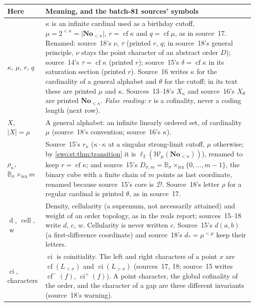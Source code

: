 \documentclass[11pt]{article}
\theoremstyle{definition}
\theoremstyle{remark}
\newcommand{\No}{\mathbf{No}}
\newcommand{\WO}{\mathcal W}
\newcommand{\B}{\mathbb B}
\newcommand{\lex}{\mathrm{lex}}
\newcommand{\cf}{\operatorname{cf}}
\newcommand{\bl}{\ell_2}
\newcommand{\card}[1]{\lvert #1\rvert}
\newcommand{\dens}{\operatorname{d}}
\newcommand{\cell}{\operatorname{cell}}
\newcommand{\weight}{\operatorname{w}}
\newcommand{\ci}{\operatorname{ci}}
\begin{document}
\begingroup\small
\begin{longtable}{@{}>{\raggedright\arraybackslash}p{}>{\raggedright\arraybackslash}p{}@{}}
\toprule
Here & Meaning, and the batch-81 sources' symbols\\
\midrule\endhead
$\kappa$, $\mu$, $r$, $q$ &
$\kappa$ is an infinite cardinal used as a birthday cutoff,
$\mu=2^{<\kappa}=\card{\No_{<\kappa}}$, $r=\cf\kappa$ and $q=\cf\mu$, as in
source~17. Renamed: source~18's $\nu$, $\tau$ (printed $r$, $q$; in source~18's
general principle, $\nu$ stays the point character of an abstract order $D$);
source~14's $\tau=\cf\kappa$ (printed $r$); source~15's $\delta=\cf\kappa$ in its
saturation section (printed $r$). Source~16 writes $\kappa$ for the
cardinality of a general alphabet and $\theta$ for the cutoff; in its text
these are printed $\mu$ and $\kappa$. Sources~13--18's $X_\kappa$ and
source~16's $X_\theta$ are printed $\No_{<\kappa}$. \emph{False reading:} $r$ is
a cofinality, never a coding length (next row).\\[3pt]
$X$, $\card X=\mu$ &
A general alphabet: an infinite linearly ordered set, of cardinality $\mu$
(source~18's convention; source~16's $\kappa$).\\[3pt]
$\rho_\kappa$, $\B_\sigma\times_\lex m$ &
Source~15's $r_\kappa$ ($\kappa\cdot\kappa$ at a singular strong-limit cutoff,
$\mu$ otherwise; by \cref{swo:st:thm:transition} it is
$\bl(\WO_\mu(\No_{<\kappa}))$), renamed to keep $r=\cf\kappa$; and source~15's
$D_{\sigma,m}=\B_\sigma\times_{\lex}\{0,\ldots,m-1\}$, the binary cube with a
finite chain of $m$ points as last coordinate, renamed because source~15's
core is $\mathcal D$. Source~18's letter $\rho$ for a regular cardinal is
printed $\theta$, as in source~17.\\[3pt]
$\dens$, $\cell$, $\weight$ &
Density, cellularity (a supremum, not necessarily attained) and weight of an
order topology, as in the reals report; sources~15--18 write $d$, $c$, $w$.
Cellularity is never written $c$. Source~15's $d(a,b)$ (a first-difference
coordinate) and source~18's $d_*=\mu^{<\mu}$ keep their letters.\\[3pt]
$\ci$, characters &
$\ci$ is coinitiality. The left and right characters of a point $x$ are
$\cf(L_{<x})$ and $\ci(L_{>x})$ (sources~17, 18; source~15 writes
$\operatorname{cf}^-(f)$, $\operatorname{ci}^+(f)$). A point character, the
global cofinality of the order, and the character of a gap are three
different invariants (source~18's warning).\\[3pt]

\end{longtable}
\end{document}
